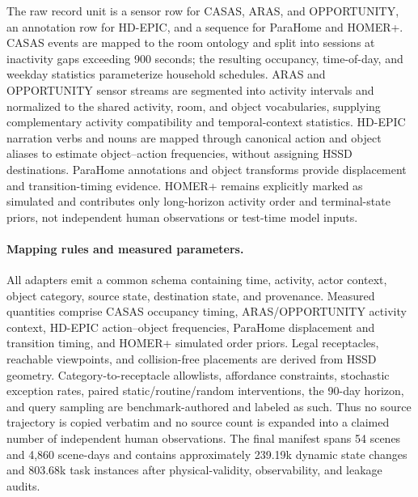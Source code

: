 The raw record unit is a sensor row for CASAS, ARAS, and OPPORTUNITY, an annotation row
for HD-EPIC, and a sequence for ParaHome and HOMER+. CASAS events are mapped to
the room ontology and split into sessions at inactivity gaps exceeding 900 seconds;
the resulting occupancy, time-of-day, and weekday statistics parameterize
household schedules. ARAS and OPPORTUNITY sensor streams are segmented into
activity intervals and normalized to the shared activity, room, and object
vocabularies, supplying complementary activity compatibility and temporal-context
statistics. HD-EPIC narration verbs and nouns are mapped through canonical
action and object aliases to estimate object--action frequencies, without
assigning HSSD destinations. ParaHome annotations and object transforms provide
displacement and transition-timing evidence. HOMER+ remains explicitly marked
as simulated and contributes only long-horizon activity order and terminal-state
priors, not independent human observations or test-time model inputs.

\paragraph{Mapping rules and measured parameters.}
All adapters emit a common schema containing time, activity, actor context,
object category, source state, destination state, and provenance. Measured
quantities comprise CASAS occupancy timing, ARAS/OPPORTUNITY activity context,
HD-EPIC action--object frequencies, ParaHome displacement and transition timing,
and HOMER+ simulated order priors. Legal receptacles, reachable
viewpoints, and collision-free placements are derived from HSSD geometry.
Category-to-receptacle allowlists, affordance constraints, stochastic exception
rates, paired static/routine/random interventions, the 90-day horizon, and query
sampling are benchmark-authored and labeled as such. Thus no source trajectory
is copied verbatim and no source count is expanded into a claimed number of
independent human observations. The final manifest spans 54 scenes and 4,860
scene-days and contains approximately 239.19k dynamic state changes and 803.68k
task instances after physical-validity, observability, and leakage audits.

